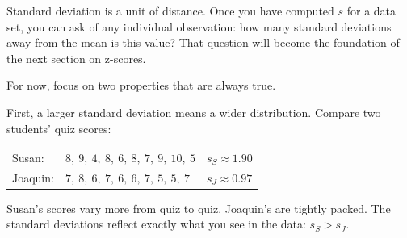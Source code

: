 Standard deviation is a unit of distance. Once you have computed $s$
for a data set, you can ask of any individual observation: how many
standard deviations away from the mean is this value? That question
will become the foundation of the next section on z-scores.

For now, focus on two properties that are always true.

First, a larger standard deviation means a wider distribution. Compare
two students' quiz scores:

\begin{center}
\begin{tabular}{lll}
Susan: & $8,\ 9,\ 4,\ 8,\ 6,\ 8,\ 7,\ 9,\ 10,\ 5$ &
$s_S \approx 1.90$ \\[2pt]
Joaquin: & $7,\ 8,\ 6,\ 7,\ 6,\ 6,\ 7,\ 5,\ 5,\ 7$ &
$s_J \approx 0.97$ \\
\end{tabular}
\end{center}

Susan's scores vary more from quiz to quiz. Joaquin's are tightly
packed. The standard deviations reflect exactly what you see in the
data: $s_S > s_J$.

